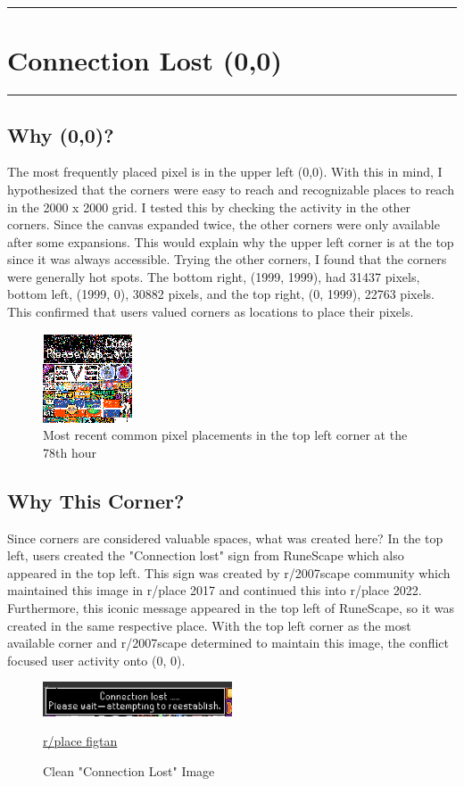 {\color{gray}\hrule}
\section{Connection Lost (0,0)}
{\color{gray}\hrule}

\subsection{Why (0,0)?}
The most frequently placed pixel is in the upper left (0,0). With this in mind, I hypothesized that the corners were easy to reach and recognizable places to reach in the 2000 x 2000 grid. I tested this by checking the activity in the other corners. Since the canvas expanded twice, the other corners were only available after some expansions. This would explain why the upper left corner is at the top since it was always accessible. Trying the other corners, I found that the corners were generally hot spots. The bottom right, (1999, 1999), had 31437 pixels, bottom left, (1999, 0), 30882 pixels, and the top right, (0, 1999), 22763 pixels. This confirmed that users valued corners as locations to place their pixels.

\begin{figure}[H]
\centering
\includegraphics{visuals/0_0_100_78_mode_1_1}
    \caption{Most recent common pixel placements in the top left corner at the 78th hour}
\end{figure}

\subsection{Why This Corner?}

Since corners are considered valuable spaces, what was created here? In the top left, users created the "Connection lost" sign from RuneScape which also appeared in the top left. This sign was created by r/2007scape community which maintained this image in r/place 2017 and continued this into r/place 2022. Furthermore, this iconic message appeared in the top left of RuneScape, so it was created in the same respective place. With the top left corner as the most available corner and r/2007scape determined to maintain this image, the conflict focused user activity onto (0, 0).

\begin{figure}[H]
\centering
\includegraphics[width=0.5\textwidth]{visuals/connection_lost}
    \caption{Clean "Connection Lost" Image}
    \href{https://www.reddit.com/r/place/comments/tukrrl/the_connection_lost_banner_what_is_this_anyway/}{r/place figtan}
\end{figure}
